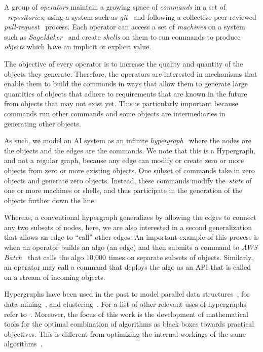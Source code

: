 A group of \emph{operators} maintain a growing space of \emph{commands} in a set of ~\emph{repositories}, using a system such as \emph{git}~\cite{git} and following a collective peer-reviewed \emph{pull-request}~\cite{pull_request} process. Each operator can access a set of \emph{machines} on a system such as \emph{SageMaker}~\cite{sagemaker} and create \emph{shells} on them to run commands to produce \emph{objects} which have an implicit or explicit value.

The objective of every operator is to increase the quality and quantity of the objects they generate. Therefore, the operators are interested in mechanisms that enable them to build the commands in ways that allow them to generate large quantities of objects that adhere to requirements that are known in the future from objects that may not exist yet. This is particularly important because commands run other commands and some objects are intermediaries in generating other objects.

As such, we model an AI system as an infinite \emph{hypergraph}~\cite{Hypergraph13} where the nodes are the objects and the edges are the commands. We note that this is a Hypergraph, and not a regular graph, because any edge can modify or create zero or more objects from zero or more existing objects. One subset of commands take in zero objects and generate zero objects. Instead, these commands modify the~\emph{state} of one or more machines or shells, and thus participate in the generation of the objects further down the line.

Whereas, a conventional hypergraph generalizes by allowing the edges to connect any two subsets of nodes, here, we are also interested in a second generalization that allows an edge to ``call'' other edges. An important example of this process is when an operator builds an algo (an edge) and then submits a command to \emph{AWS Batch}~\cite{aws_batch} that calls the algo 10,000 times on separate subsets of objects. Similarly, an operator may call a command that deploys the algo as an API that is called on a stream of incoming objects.

Hypergraphs have been used in the past to model parallel data structures~\cite{HK00}, for data mining~\cite{HBC07}, and clustering~\cite{BP09}. For a list of other relevant uses of hypergraphs refer to~\cite{Hypergraph13}. Moreover, the focus of this work is the development of mathematical tools for the optimal combination of algorithms as black boxes towards practical objectives. This is different from optimizing the internal workings of the same algorithms~\cite{kutyniok2022,peyre2025}.

